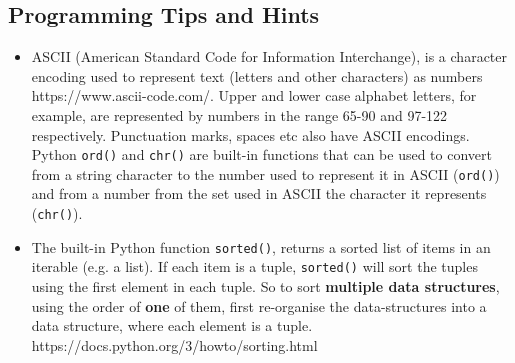 \documentclass[11pt]{report}
\begin{document}
\subsection*{Programming Tips and Hints}
\begin{itemize}
    \item ASCII (American Standard Code for Information Interchange), is a character encoding used to represent text (letters and other characters) as numbers https://www.ascii-code.com/. Upper and lower case alphabet letters, for example, are represented by numbers in the range 65-90 and 97-122 respectively. Punctuation marks, spaces etc also have ASCII encodings. \newline Python {\tt ord()} and {\tt chr()} are built-in functions that can be used to convert from a string character to the number used to represent it in ASCII ({\tt ord()}) and from a number from the set used in ASCII the character it represents ({\tt chr()}).   
    \item The built-in Python function {\tt sorted()}, returns a sorted list of items in an iterable (e.g. a list). If each item is a tuple, {\tt sorted()} will sort the tuples using the first element in each tuple. \newline So to sort {\bf multiple data structures}, using the order of {\bf one} of them, first re-organise the data-structures into a data structure, where each element is a tuple.  \newline https://docs.python.org/3/howto/sorting.html

\end{itemize}
    
\newpage
\end{document}
